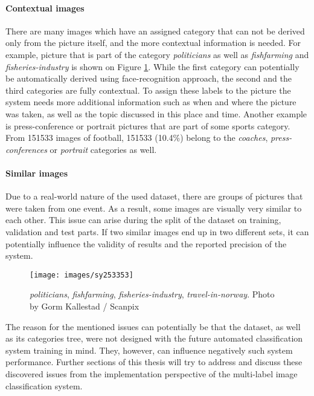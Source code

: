 \paragraph{Contextual images}
There are many images which have an assigned category that can not be derived only from the picture itself, and the more contextual information is needed. For example, picture that is part of the category \textit{politicians} as well as \textit{fishfarming} and \textit{fisheries-industry} is shown on Figure \ref{fig:politician-fish}. While the first category can potentially be automatically derived using face-recognition approach, the second and the third categories are fully contextual. To assign these labels to the picture the system needs more additional information such as when and where the picture was taken, as well as the topic discussed in this place and time. Another example is press-conference or portrait pictures that are part of some sports category. From 151533 images of football, 151533 (10.4\%) belong to the \textit{coaches}, \textit{press-conferences} or \textit{portrait} categories as well.

\paragraph{Similar images}
Due to a real-world nature of the used dataset, there are groups of pictures that were taken from one event. As a result, some images are visually very similar to each other. This issue can arise during the split of the dataset on training, validation and test parts. If two similar images end up in two different sets, it can potentially influence the validity of results and the reported precision of the system.

\begin{figure}[ht!]
    \centering
    \texttt{[image: images/sy253353]}
    \caption[Example of contextual image]{\textit{politicians}, \textit{fishfarming}, \textit{fisheries-industry}, \textit{travel-in-norway}. Photo by Gorm Kallestad / Scanpix}
    \label{fig:politician-fish}
\end{figure}

The reason for the mentioned issues can potentially be that the dataset, as well as its categories tree, were not designed with the future automated classification system training in mind. They, however, can influence negatively such system performance. Further sections of this thesis will try to address and discuss these discovered issues from the implementation perspective of the multi-label image classification system.

